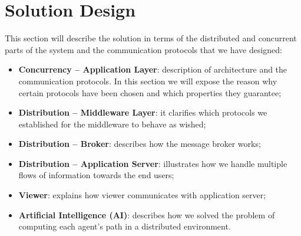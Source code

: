 \section{Solution Design}

This section will describe the solution in terms of the distributed and
concurrent parts of the system and the communication protocols that we have
designed:

\begin{itemize}
\item \textbf{Concurrency -- Application Layer}:
  description of architecture and the communication protocols.
  In this section we
  will expose the reason why certain protocols have been chosen and which
  properties they guarantee;
\item \textbf{Distribution -- Middleware Layer}:
  it clarifies which protocols
  we established for the middleware to behave as wished;
\item \textbf{Distribution -- Broker}:
  describes how the message broker works;
\item \textbf{Distribution -- Application Server}:
  illustrates how we handle multiple flows of information towards the end
  users;
\item \textbf{Viewer}:
  explains how viewer communicates with application server;
\item \textbf{Artificial Intelligence (AI)}:
  describes how we solved the problem of computing each agent's path
  in a distributed environment.
\end{itemize}









